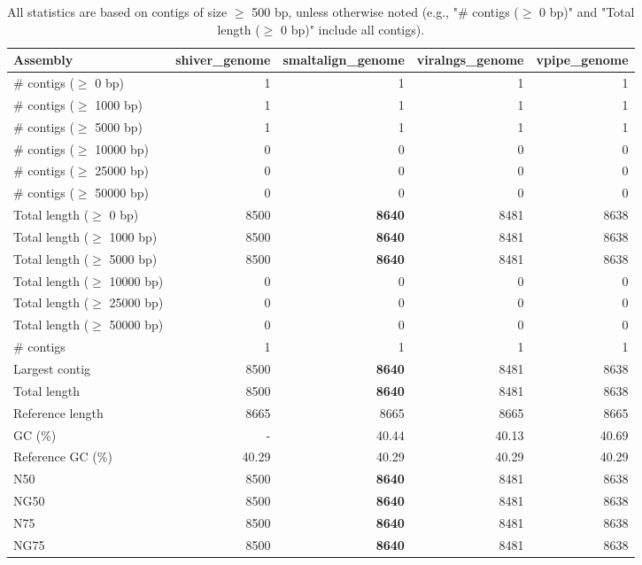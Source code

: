 \documentclass[12pt,a4paper]{article}
\begin{document}
\begin{table}[ht]
\begin{center}
\caption{All statistics are based on contigs of size $\geq$ 500 bp, unless otherwise noted (e.g., "\# contigs ($\geq$ 0 bp)" and "Total length ($\geq$ 0 bp)" include all contigs).}
\begin{tabular}{|l*{4}{|r}|}
\hline
Assembly & shiver\_genome & smaltalign\_genome & viralngs\_genome & vpipe\_genome \\ \hline
\# contigs ($\geq$ 0 bp) & 1 & 1 & 1 & 1 \\ \hline
\# contigs ($\geq$ 1000 bp) & 1 & 1 & 1 & 1 \\ \hline
\# contigs ($\geq$ 5000 bp) & 1 & 1 & 1 & 1 \\ \hline
\# contigs ($\geq$ 10000 bp) & 0 & 0 & 0 & 0 \\ \hline
\# contigs ($\geq$ 25000 bp) & 0 & 0 & 0 & 0 \\ \hline
\# contigs ($\geq$ 50000 bp) & 0 & 0 & 0 & 0 \\ \hline
Total length ($\geq$ 0 bp) & 8500 & {\bf 8640} & 8481 & 8638 \\ \hline
Total length ($\geq$ 1000 bp) & 8500 & {\bf 8640} & 8481 & 8638 \\ \hline
Total length ($\geq$ 5000 bp) & 8500 & {\bf 8640} & 8481 & 8638 \\ \hline
Total length ($\geq$ 10000 bp) & 0 & 0 & 0 & 0 \\ \hline
Total length ($\geq$ 25000 bp) & 0 & 0 & 0 & 0 \\ \hline
Total length ($\geq$ 50000 bp) & 0 & 0 & 0 & 0 \\ \hline
\# contigs & 1 & 1 & 1 & 1 \\ \hline
Largest contig & 8500 & {\bf 8640} & 8481 & 8638 \\ \hline
Total length & 8500 & {\bf 8640} & 8481 & 8638 \\ \hline
Reference length & 8665 & 8665 & 8665 & 8665 \\ \hline
GC (\%) & - & 40.44 & 40.13 & 40.69 \\ \hline
Reference GC (\%) & 40.29 & 40.29 & 40.29 & 40.29 \\ \hline
N50 & 8500 & {\bf 8640} & 8481 & 8638 \\ \hline
NG50 & 8500 & {\bf 8640} & 8481 & 8638 \\ \hline
N75 & 8500 & {\bf 8640} & 8481 & 8638 \\ \hline
NG75 & 8500 & {\bf 8640} & 8481 & 8638 \\ \hline

\end{tabular}
\end{center}
\end{table}
\end{document}
